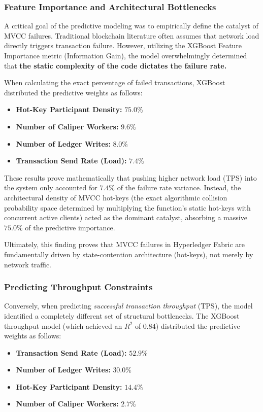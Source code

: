 \documentclass[manuscript,screen]{acmart}
\begin{document}
	\subsubsection{Feature Importance and Architectural Bottlenecks}
	A critical goal of the predictive modeling was to empirically define the catalyst of MVCC failures. Traditional blockchain literature often assumes that network load directly triggers transaction failure. However, utilizing the XGBoost Feature Importance metric (Information Gain), the model overwhelmingly determined that \textbf{the static complexity of the code dictates the failure rate.}
	
	When calculating the exact percentage of failed transactions, XGBoost distributed the predictive weights as follows:
	\begin{itemize}
	    \item \textbf{Hot-Key Participant Density:} $75.0\%$
	    \item \textbf{Number of Caliper Workers:} $9.6\%$
	    \item \textbf{Number of Ledger Writes:} $8.0\%$
	    \item \textbf{Transaction Send Rate (Load):} $7.4\%$
	\end{itemize}
	
	These results prove mathematically that pushing higher network load (TPS) into the system only accounted for $7.4\%$ of the failure rate variance. Instead, the architectural density of MVCC hot-keys (the exact algorithmic collision probability space determined by multiplying the function's static hot-keys with concurrent active clients) acted as the dominant catalyst, absorbing a massive $75.0\%$ of the predictive importance. 
	
	Ultimately, this finding proves that MVCC failures in Hyperledger Fabric are fundamentally driven by state-contention architecture (hot-keys), not merely by network traffic.

	\subsubsection{Predicting Throughput Constraints}
	Conversely, when predicting \textit{successful transaction throughput} (TPS), the model identified a completely different set of structural bottlenecks. The XGBoost throughput model (which achieved an $R^2$ of $0.84$) distributed the predictive weights as follows:
	\begin{itemize}
	    \item \textbf{Transaction Send Rate (Load):} $52.9\%$
	    \item \textbf{Number of Ledger Writes:} $30.0\%$
	    \item \textbf{Hot-Key Participant Density:} $14.4\%$
	    \item \textbf{Number of Caliper Workers:} $2.7\%$
	\end{itemize}
	
\end{document}
